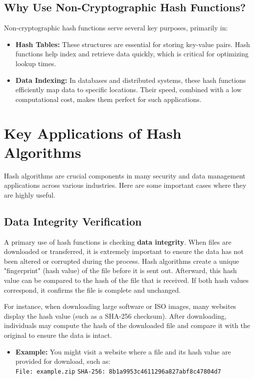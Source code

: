 \documentclass[11pt,a4paper]{article}
\begin{document}
    \subsection*{Why Use Non-Cryptographic Hash Functions?}
    Non-cryptographic hash functions serve several key purposes, primarily in:
        \begin{itemize}
            \item \textbf{Hash Tables:} These structures are essential for storing key-value pairs. Hash functions help index and retrieve data quickly, which is critical for optimizing lookup times.

            \item \textbf{Data Indexing:} In databases and distributed systems, these hash functions efficiently map data to specific locations. Their speed, combined with a low computational cost, makes them perfect for such applications.

        \end{itemize}

\section*{Key Applications of Hash Algorithms}
Hash algorithms are crucial components in many security and data management applications across various industries. Here are some important cases where they are highly useful.

        \subsection*{Data Integrity Verification}
        A primary use of hash functions is checking \textbf{data integrity}. When files are downloaded or transferred, it is extremely important to ensure the data has not been altered or corrupted during the process. Hash algorithms create a unique "fingerprint" (hash value) of the file before it is sent out. Afterward, this hash value can be compared to the hash of the file that is received. If both hash values correspond, it confirms the file is complete and unchanged.

        For instance, when downloading large software or ISO images, many websites display the hash value (such as a SHA-256 checksum). After downloading, individuals may compute the hash of the downloaded file and compare it with the original to ensure the data is intact.

        \begin{itemize}
            \item \textbf{Example:} You might visit a website where a file and its hash value are provided for download, such as:
            \\[1em]
            \lstinline{File: example.zip}
            \newline
            \lstinline{SHA-256: 8b1a9953c4611296a827abf8c47804d7}

        \end{itemize}
\end{document}
